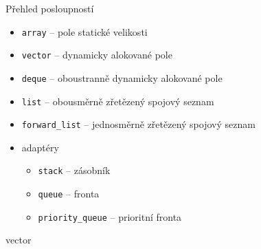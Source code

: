 
\begin{frame}[fragile]
\begin{block}{Přehled posloupností}
\begin{itemize}
\item \lstinline|array| -- pole statické velikosti
\item \lstinline|vector| -- dynamicky alokované pole
\item \lstinline|deque| -- oboustranně dynamicky alokované pole
\item \lstinline|list| -- obousměrně zřetězený spojový seznam
\item \lstinline|forward_list| -- jednosměrně zřetězený spojový seznam
\item adaptéry 
\begin{itemize}
\item \lstinline|stack| -- zásobník
\item \lstinline|queue| -- fronta
\item \lstinline|priority_queue| -- prioritní fronta
\end{itemize}
\end{itemize}
\end{block}
\end{frame}




\begin{frame}[fragile]
\begin{block}{vector}
\end{block}
\end{frame}


